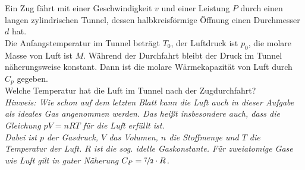 \begin{Exercise}[title = Tunnel, origin = {EstPhO 2009}, difficulty = 3, label = train]
	Ein Zug fährt mit einer Geschwindigkeit $v$ und einer Leistung $P$ durch einen langen zylindrischen Tunnel, dessen halbkreisförmige Öffnung einen Durchmesser $d$ hat.\\
	Die Anfangstemperatur im Tunnel beträgt $T_0$, der Luftdruck ist $p_0$, die molare Masse von Luft ist $M$. Während der Durchfahrt bleibt der Druck im Tunnel näherungsweise konstant. Dann ist die molare Wärmekapazität von Luft durch $C_p$ gegeben.\\
	Welche Temperatur hat die Luft im Tunnel nach der Zugdurchfahrt?\\
	\textit{Hinweis: Wie schon auf dem letzten Blatt kann die Luft auch in dieser Aufgabe als \textit{ideales Gas} angenommen werden. Das heißt insbesondere auch, dass die Gleichung $pV = nRT$ für die Luft erfüllt ist. \\
	Dabei ist $p$ der Gasdruck, $V$ das Volumen, $n$ die Stoffmenge und $T$ die Temperatur der Luft. $R$ ist die sog. idelle Gaskonstante. Für zweiatomige Gase wie Luft gilt in guter Näherung $C_P = \nicefrac{7}{2}\cdot R$.}
\end{Exercise}